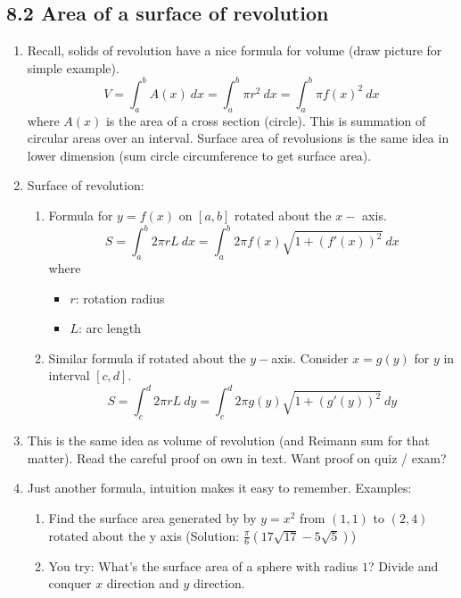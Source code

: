 \documentclass{article}
\begin{document}
\subsection{8.2 Area of a surface of revolution}

\begin{enumerate}
\item Recall, solids of revolution have a nice formula for volume (draw picture for simple example). 
\[
V = \int_a^b A(x) ~dx = \int_a^b \pi r^2 ~dx = \int_a^b \pi f(x)^2 ~dx 
\]
where $A(x)$ is the area of a cross section (circle). This is summation of circular areas over an interval. Surface area of revolusions is the same idea in lower dimension (sum circle circumference to get surface area).

\item Surface of revolution:
\begin{enumerate}
\item Formula for $y=f(x)$ on $[a,b]$ rotated about the $x-$ axis.
\[
S = \int_a^b 2\pi r L~dx = \int_a^b 2\pi f(x)\sqrt{1+(f'(x))^2}~dx
\]
where
\begin{itemize}
\item $r$: rotation radius
\item $L$: arc length
\end{itemize}
\item Similar formula if rotated about the $y-$axis. Consider $x=g(y)$ for $y$ in interval $[c,d]$. 
\[
S = \int_c^d 2\pi r L~dy = \int_c^d 2\pi g(y)\sqrt{1+(g'(y))^2}~dy
\]
\end{enumerate}

\item This is the same idea as volume of revolution (and Reimann sum for that matter). Read the careful proof on own in text. Want proof on quiz / exam?

\item Just another formula, intuition makes it easy to remember. Examples:
\begin{enumerate}
\item Find the surface area generated by by $y = x^2$ from $(1,1)$ to $(2,4)$ rotated about the y axis (Solution: $\frac{\pi}{6}(17\sqrt{17}-5\sqrt{5})$)
\item You try: What's the surface area of a sphere with radius $1$? Divide and conquer $x$ direction and $y$ direction.
\end{enumerate}


\end{enumerate}
\end{document}
